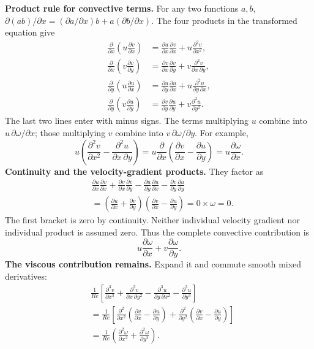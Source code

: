 \textbf{Product rule for convective terms.} For any two functions $a,b$, $\partial(ab)/\partial x=(\partial a/\partial x)b+a(\partial b/\partial x)$. The four products in the transformed equation give
\begin{align*}
\frac{\partial}{\partial x}\left(u\frac{\partial v}{\partial x}\right)
&=\frac{\partial u}{\partial x}\frac{\partial v}{\partial x}+u\frac{\partial^2v}{\partial x^2},\\
\frac{\partial}{\partial x}\left(v\frac{\partial v}{\partial y}\right)
&=\frac{\partial v}{\partial x}\frac{\partial v}{\partial y}+v\frac{\partial^2v}{\partial x\,\partial y},\\
\frac{\partial}{\partial y}\left(u\frac{\partial u}{\partial x}\right)
&=\frac{\partial u}{\partial y}\frac{\partial u}{\partial x}+u\frac{\partial^2u}{\partial y\,\partial x},\\
\frac{\partial}{\partial y}\left(v\frac{\partial u}{\partial y}\right)
&=\frac{\partial v}{\partial y}\frac{\partial u}{\partial y}+v\frac{\partial^2u}{\partial y^2}.
\end{align*}
The last two lines enter with minus signs. The terms multiplying $u$ combine into $u\,\partial\omega/\partial x$; those multiplying $v$ combine into $v\,\partial\omega/\partial y$. For example,
\[
u\left(\frac{\partial^2v}{\partial x^2}-\frac{\partial^2u}{\partial x\,\partial y}\right)
=u\frac{\partial}{\partial x}\left(\frac{\partial v}{\partial x}-\frac{\partial u}{\partial y}\right)
=u\frac{\partial\omega}{\partial x}.
\]
\newpage
{}
\textbf{Continuity and the velocity-gradient products.} They factor as
\begin{align*}
&\frac{\partial u}{\partial x}\frac{\partial v}{\partial x}
+\frac{\partial v}{\partial x}\frac{\partial v}{\partial y}
-\frac{\partial u}{\partial y}\frac{\partial u}{\partial x}
-\frac{\partial v}{\partial y}\frac{\partial u}{\partial y}\\
&=\left(\frac{\partial u}{\partial x}+\frac{\partial v}{\partial y}\right)
\left(\frac{\partial v}{\partial x}-\frac{\partial u}{\partial y}\right)
=0\times\omega=0.
\end{align*}
The first bracket is zero by continuity. Neither individual velocity gradient nor individual product is assumed zero. Thus the complete convective contribution is
\[
u\frac{\partial\omega}{\partial x}+v\frac{\partial\omega}{\partial y}.
\]
\textbf{The viscous contribution remains.} Expand it and commute smooth mixed derivatives:
\begin{align*}
&\frac{1}{Re}\left[
\frac{\partial^3v}{\partial x^3}
+\frac{\partial^3v}{\partial x\,\partial y^2}
-\frac{\partial^3u}{\partial y\,\partial x^2}
-\frac{\partial^3u}{\partial y^3}\right]\\
&=\frac{1}{Re}\left[
\frac{\partial^2}{\partial x^2}\left(\frac{\partial v}{\partial x}-\frac{\partial u}{\partial y}\right)
+\frac{\partial^2}{\partial y^2}\left(\frac{\partial v}{\partial x}-\frac{\partial u}{\partial y}\right)\right]\\
&=\frac{1}{Re}\left(\frac{\partial^2\omega}{\partial x^2}+\frac{\partial^2\omega}{\partial y^2}\right).
\end{align*}
